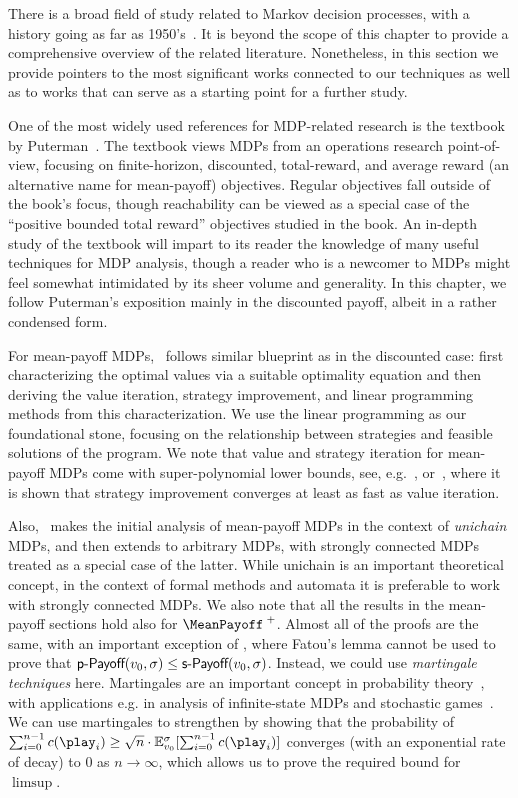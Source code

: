 There is a broad field of study related to Markov decision processes, with a history going as far as  1950's~\cite{Bellman:1957}. It is beyond the scope of this chapter to provide a comprehensive overview of the related literature. Nonetheless, in this section we provide pointers to the most significant works connected to our techniques as well as to works that can serve as a starting point for a further study.

One of the most widely used references for MDP-related research is the textbook by Puterman~\cite{Puterman:2005}. The textbook views MDPs from an operations research point-of-view, focusing on finite-horizon, discounted, total-reward, and average reward (an alternative name for mean-payoff) objectives. Regular objectives fall outside of the book's focus, though reachability can be viewed as a special case of the ``positive bounded total reward'' objectives studied in the book. An in-depth study of the textbook will impart to its reader the knowledge of many useful techniques for MDP analysis, though a reader who is a newcomer to MDPs might feel somewhat intimidated by its sheer volume and generality. In this chapter, we follow Puterman's exposition mainly in the discounted payoff, albeit in a rather condensed form. 

For mean-payoff MDPs,~\cite{Puterman:2005} follows similar blueprint as in the discounted case: first characterizing the optimal values via a suitable optimality equation and then deriving the value iteration, strategy improvement, and linear programming methods from this characterization. We use the linear programming as our foundational stone, focusing on the relationship between strategies and feasible solutions of the program. We note that value and strategy iteration for mean-payoff MDPs come with super-polynomial lower bounds, see, e.g.~\cite{Fearnley:2010,Fearnley:2010b}, or~\cite{Puterman:2005}, where it is shown that strategy improvement converges at least as fast as value iteration.

Also,~\cite{Puterman:2005} makes the initial analysis of mean-payoff MDPs in the context of \emph{unichain} MDPs, and then extends to arbitrary MDPs, with strongly connected MDPs treated as a special case of the latter. While unichain is an important theoretical concept, in the context of formal methods and automata it is preferable to work with strongly connected MDPs. We also note that all the results in the mean-payoff sections hold also for $\MeanPayoffSup$. Almost all of the proofs are the same, with an important exception of , where Fatou's lemma cannot be used to prove that $\textsf{p-Payoff}(v_0,\sigma) \leq \textsf{s-Payoff}(v_0,\sigma)$. Instead, we could use \emph{martingale techniques} here. Martingales are an important concept in probability theory~\cite{Williams:1991}, with applications e.g. in analysis of infinite-state MDPs and stochastic games~\cite{Brazdil&Brozek&Etessami&Kucera:2011}. We can use martingales to strengthen  by showing that the probability  of $\sum_{i=0}^{n-1}\colouring(\play_i) \geq \sqrt{n}\cdot \expv^\sigma_{\vinit}[\sum_{i=0}^{n-1}\colouring(\play_i)]$ converges (with an exponential rate of decay) to $0$ as $n\rightarrow \infty$, which allows us to prove the required bound for $\limsup$.

